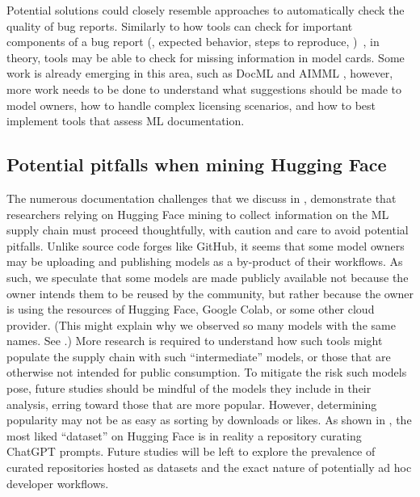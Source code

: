 Potential solutions could closely resemble approaches to automatically check the quality of bug reports. Similarly to how tools can check for important components of a bug report (\eg, expected behavior, steps to reproduce, \etc)~\cite{chaparro2017detecting}, in theory, tools may be able to check for missing information in model cards. %
Some work is already emerging in this area, such as DocML \cite{bhat2023aspirations} and AIMML \cite{TsayBHSM20}, however, more work needs to be done to understand what suggestions should be made to model owners, how to handle complex licensing scenarios, and how to best implement tools that assess ML documentation. %




\subsection{Potential pitfalls when mining Hugging Face}
The numerous documentation challenges that we discuss in , demonstrate that researchers relying on Hugging Face mining to collect information on the ML supply chain must proceed thoughtfully, with caution and care to avoid potential pitfalls. %
Unlike source code forges like GitHub, it seems that some model owners may be uploading and publishing models as a by-product of their workflows. As such, we speculate that some models are made publicly available not because the owner intends them to be reused by the community, but rather because the owner is using the resources of Hugging Face, Google Colab, or some other cloud provider. %
(This might explain why we observed so many models with the same names.  See .) More research is required to understand how such tools might populate the supply chain with such ``intermediate'' models, or those that are otherwise not intended for public consumption. To mitigate the risk such models pose, future studies should be mindful of the models they include in their analysis, erring toward those that are more popular.  However, determining popularity may not be as easy as sorting by downloads or likes.  As shown in , the most liked ``dataset'' on Hugging Face is in reality a repository curating ChatGPT prompts.  Future studies will be left to explore the prevalence of curated repositories hosted as datasets and the exact nature of potentially ad hoc developer workflows.








